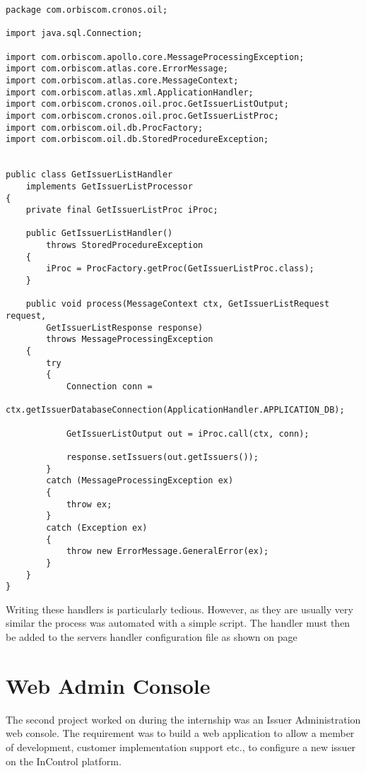 \documentclass[a4paper, 11pt, titlepage]{article}
\begin{document}
\begin{verbatim} 
package com.orbiscom.cronos.oil; 
 
import java.sql.Connection; 
 
import com.orbiscom.apollo.core.MessageProcessingException; 
import com.orbiscom.atlas.core.ErrorMessage; 
import com.orbiscom.atlas.core.MessageContext; 
import com.orbiscom.atlas.xml.ApplicationHandler; 
import com.orbiscom.cronos.oil.proc.GetIssuerListOutput; 
import com.orbiscom.cronos.oil.proc.GetIssuerListProc; 
import com.orbiscom.oil.db.ProcFactory; 
import com.orbiscom.oil.db.StoredProcedureException; 
 
 
public class GetIssuerListHandler 
    implements GetIssuerListProcessor 
{ 
    private final GetIssuerListProc iProc; 
 
    public GetIssuerListHandler() 
        throws StoredProcedureException 
    { 
        iProc = ProcFactory.getProc(GetIssuerListProc.class); 
    } 
 
    public void process(MessageContext ctx, GetIssuerListRequest request,
        GetIssuerListResponse response) 
        throws MessageProcessingException 
    { 
        try 
        { 
            Connection conn = 
                ctx.getIssuerDatabaseConnection(ApplicationHandler.APPLICATION_DB); 
 
            GetIssuerListOutput out = iProc.call(ctx, conn); 
 
            response.setIssuers(out.getIssuers()); 
        } 
        catch (MessageProcessingException ex) 
        { 
            throw ex; 
        } 
        catch (Exception ex) 
        { 
            throw new ErrorMessage.GeneralError(ex); 
        } 
    } 
} 
\end{verbatim} 
Writing these handlers is particularly tedious. However, as they are usually very similar the process was automated with a simple script. 
The handler must then be added to the servers handler configuration file as shown on page \pageref{handlerset} 
 
\cite{OIL} 
 
\section{Web Admin Console} 
The second project worked on during the internship was an Issuer Administration web console. The requirement was to build a web application to allow a member of development, customer implementation support etc., to configure a new issuer on the InControl platform. 
 
\end{document}
